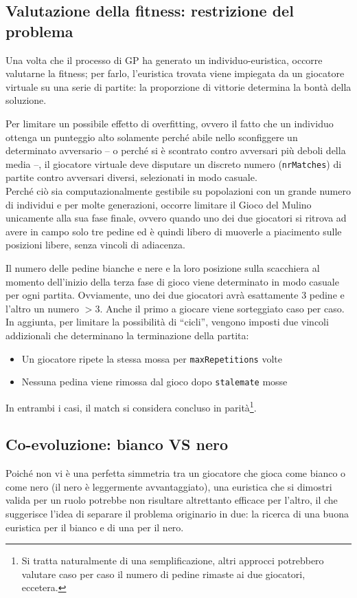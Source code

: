 \documentclass{../llncs}
\begin{document}
\subsection{Valutazione della fitness: restrizione del problema}
Una volta che il processo di GP ha generato un individuo-euristica, occorre valutarne la fitness; per farlo, l'euristica trovata viene impiegata da un giocatore virtuale su una serie di partite: la proporzione di vittorie determina la bontà della soluzione.

Per limitare un possibile effetto di overfitting, ovvero il fatto che un individuo ottenga un punteggio alto solamente perché abile nello sconfiggere un determinato avversario -- o perché si è scontrato contro avversari più deboli della media --, il giocatore virtuale deve disputare un discreto numero (\texttt{nrMatches}) di partite contro avversari diversi, selezionati in modo casuale.\\

Perché ciò sia computazionalmente gestibile su popolazioni con un grande numero di individui e per molte generazioni, occorre limitare il Gioco del Mulino unicamente alla sua fase finale, ovvero quando uno dei due giocatori si ritrova ad avere in campo solo tre pedine ed è quindi libero di muoverle a piacimento sulle posizioni libere, senza vincoli di adiacenza.

Il numero delle pedine bianche e nere e la loro posizione sulla scacchiera al momento dell'inizio della terza fase di gioco viene determinato in modo casuale per ogni partita. Ovviamente, uno dei due giocatori avrà esattamente 3 pedine e l'altro un numero $>3$. Anche il primo a giocare viene sorteggiato caso per caso.\\

In aggiunta, per limitare la possibilità di ``cicli'', vengono imposti due vincoli addizionali che determinano la terminazione della partita:
\begin{itemize}
\item Un giocatore ripete la stessa mossa per \texttt{maxRepetitions} volte
\item Nessuna pedina viene rimossa dal gioco dopo \texttt{stalemate} mosse 
\end{itemize}
In entrambi i casi, il match si considera concluso in parità\footnote{Si tratta naturalmente di una semplificazione, altri approcci potrebbero valutare caso per caso il numero di pedine rimaste ai due giocatori, eccetera.}.

\subsection{Co-evoluzione: bianco VS nero}
Poiché non vi è una perfetta simmetria tra un giocatore che gioca come bianco o come nero (il nero è leggermente avvantaggiato), una euristica che si dimostri valida per un ruolo potrebbe non risultare altrettanto efficace per l'altro, il che suggerisce l'idea di separare il problema originario in due: la ricerca di una buona euristica per il bianco e di una per il nero.
\end{document}
